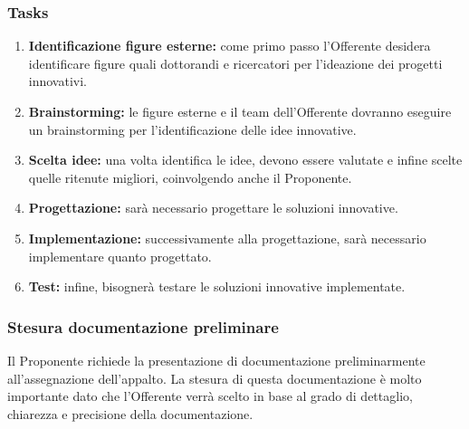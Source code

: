                     \subsubsection*{Tasks}
                    \begin{enumerate}
                    	\item \textbf{Identificazione figure esterne:} come primo passo l'Offerente desidera identificare figure quali dottorandi e ricercatori per l'ideazione dei progetti innovativi.
                        \item \textbf{Brainstorming:} le figure esterne e il team dell'Offerente dovranno eseguire un brainstorming per l'identificazione delle idee innovative.
                        \item \textbf{Scelta idee:} una volta identifica le idee, devono essere valutate e infine scelte quelle ritenute migliori, coinvolgendo anche il Proponente.  
                        \item \textbf{Progettazione:} sarà necessario progettare le soluzioni innovative.
                        \item \textbf{Implementazione:} successivamente alla progettazione, sarà necessario implementare quanto progettato.
                        \item \textbf{Test:} infine, bisognerà testare le soluzioni innovative implementate.
                    \end{enumerate}
                    
                    
			\subsubsection{Stesura documentazione preliminare}
            	Il Proponente richiede la presentazione di documentazione preliminarmente all'assegnazione dell'appalto. La stesura di questa documentazione è molto importante dato che l'Offerente verrà scelto in base al grado di dettaglio, chiarezza e precisione della documentazione.
                

